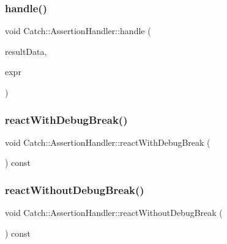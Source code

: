 \subsubsection{\texorpdfstring{handle()}{handle()}\hspace{0.1cm}{\footnotesize\ttfamily [6/6]}}
{\footnotesize\ttfamily void Catch\+::\+Assertion\+Handler\+::handle (\begin{DoxyParamCaption}\item[{Assertion\+Result\+Data const \&}]{result\+Data,  }\item[{\mbox{\hyperlink{structCatch_1_1ITransientExpression}{I\+Transient\+Expression}} const $\ast$}]{expr }\end{DoxyParamCaption})}

\mbox{\label{classCatch_1_1AssertionHandler_ad853c2b10cb31f58de26e91d66d2fd66}} 
\subsubsection{\texorpdfstring{react\+With\+Debug\+Break()}{reactWithDebugBreak()}}
{\footnotesize\ttfamily void Catch\+::\+Assertion\+Handler\+::react\+With\+Debug\+Break (\begin{DoxyParamCaption}{ }\end{DoxyParamCaption}) const}

\mbox{\label{classCatch_1_1AssertionHandler_aa3d5009f5f576abdaa0428ec7d4adf63}} 
\subsubsection{\texorpdfstring{react\+Without\+Debug\+Break()}{reactWithoutDebugBreak()}}
{\footnotesize\ttfamily void Catch\+::\+Assertion\+Handler\+::react\+Without\+Debug\+Break (\begin{DoxyParamCaption}{ }\end{DoxyParamCaption}) const}

